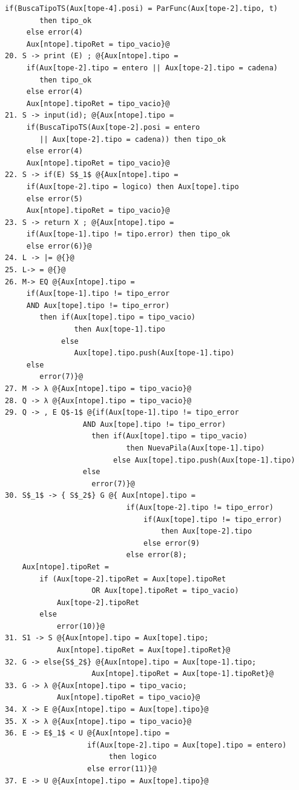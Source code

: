 \documentclass[a4paper, 12pt]{article}
\begin{document}
\begin{lstlisting}[style=EdT]
     if(BuscaTipoTS(Aux[tope-4].posi) = ParFunc(Aux[tope-2].tipo, t)
        then tipo_ok
     else error(4)
     Aux[ntope].tipoRet = tipo_vacio}@
20. S -> print (E) ; @{Aux[ntope].tipo =
     if(Aux[tope-2].tipo = entero || Aux[tope-2].tipo = cadena)
        then tipo_ok
     else error(4)
     Aux[ntope].tipoRet = tipo_vacio}@
21. S -> input(id); @{Aux[ntope].tipo =
     if(BuscaTipoTS(Aux[tope-2].posi = entero
        || Aux[tope-2].tipo = cadena)) then tipo_ok
     else error(4)
     Aux[ntope].tipoRet = tipo_vacio}@
22. S -> if(E) S$_1$ @{Aux[ntope].tipo =
     if(Aux[tope-2].tipo = logico) then Aux[tope].tipo
     else error(5)
     Aux[ntope].tipoRet = tipo_vacio}@
23. S -> return X ; @{Aux[ntope].tipo =
     if(Aux[tope-1].tipo != tipo.error) then tipo_ok
     else error(6)}@
24. L -> |= @{}@
25. L-> = @{}@
26. M-> EQ @{Aux[ntope].tipo =
     if(Aux[tope-1].tipo != tipo_error
     AND Aux[tope].tipo != tipo_error)
        then if(Aux[tope].tipo = tipo_vacio)
                then Aux[tope-1].tipo
             else
                Aux[tope].tipo.push(Aux[tope-1].tipo)
     else
        error(7)}@
27. M -> λ @{Aux[ntope].tipo = tipo_vacio}@
28. Q -> λ @{Aux[ntope].tipo = tipo_vacio}@
29. Q -> , E Q$-1$ @{if(Aux[tope-1].tipo != tipo_error
                  AND Aux[tope].tipo != tipo_error)
                    then if(Aux[tope].tipo = tipo_vacio)
                            then NuevaPila(Aux[tope-1].tipo)
                         else Aux[tope].tipo.push(Aux[tope-1].tipo)
                  else
                    error(7)}@
30. S$_1$ -> { S$_2$} G @{ Aux[ntope].tipo =
                            if(Aux[tope-2].tipo != tipo_error)
                                if(Aux[tope].tipo != tipo_error)
                                    then Aux[tope-2].tipo
                                else error(9)
                            else error(8);
	Aux[ntope].tipoRet =
		if (Aux[tope-2].tipoRet = Aux[tope].tipoRet 
					OR Aux[tope].tipoRet = tipo_vacio)
			Aux[tope-2].tipoRet
		else 
			error(10)}@
31. S1 -> S @{Aux[ntope].tipo = Aux[tope].tipo;
			Aux[ntope].tipoRet = Aux[tope].tipoRet}@
32. G -> else{S$_2$} @{Aux[ntope].tipo = Aux[tope-1].tipo;
					Aux[ntope].tipoRet = Aux[tope-1].tipoRet}@
33. G -> λ @{Aux[ntope].tipo = tipo_vacio;
			Aux[ntope].tipoRet = tipo_vacio}@
34. X -> E @{Aux[ntope].tipo = Aux[tope].tipo}@
35. X -> λ @{Aux[ntope].tipo = tipo_vacio}@
36. E -> E$_1$ < U @{Aux[ntope].tipo =
                   if(Aux[tope-2].tipo = Aux[tope].tipo = entero)
                        then logico
                   else error(11)}@
37. E -> U @{Aux[ntope].tipo = Aux[tope].tipo}@

\end{lstlisting}
\end{document}
